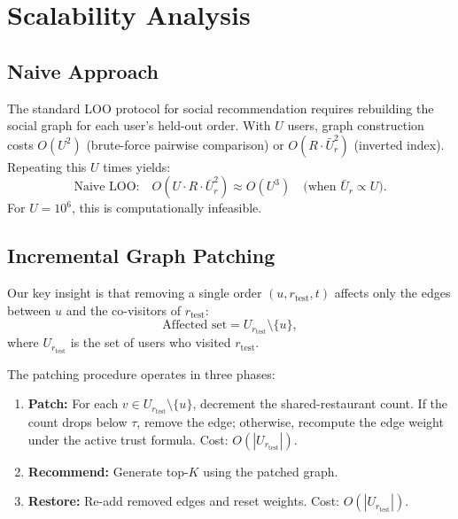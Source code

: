 \documentclass[conference]{IEEEtran}
\begin{document}
\section{Scalability Analysis}
\label{sec:scalability}

\subsection{Naive Approach}
The standard LOO protocol for social recommendation requires rebuilding
the social graph for each user's held-out order.  With $U$ users, graph
construction costs $O(U^2)$ (brute-force pairwise comparison) or
$O(R \cdot \bar{U}_r^2)$ (inverted index).  Repeating this $U$ times
yields:
\begin{equation}
  \text{Naive LOO:}\quad O(U \cdot R \cdot \bar{U}_r^2) \approx O(U^3)
    \quad \text{(when } \bar{U}_r \propto U \text{)}.
  \label{eq:naive}
\end{equation}
For $U = 10^6$, this is computationally infeasible.

\subsection{Incremental Graph Patching}
Our key insight is that removing a single order $(u, r_{\text{test}}, t)$
affects only the edges between $u$ and the co-visitors of
$r_{\text{test}}$:
\begin{equation}
  \text{Affected set} = U_{r_{\text{test}}} \setminus \{u\},
  \label{eq:affected}
\end{equation}
where $U_{r_{\text{test}}}$ is the set of users who visited
$r_{\text{test}}$.

The patching procedure operates in three phases:

\begin{enumerate}
  \item \textbf{Patch:} For each $v \in U_{r_{\text{test}}} \setminus
        \{u\}$, decrement the shared-restaurant count.  If the count drops
        below $\tau$, remove the edge; otherwise, recompute the edge weight
        under the active trust formula.  Cost: $O(|U_{r_{\text{test}}}|)$.

  \item \textbf{Recommend:} Generate top-$K$ using the patched graph.

  \item \textbf{Restore:} Re-add removed edges and reset weights.  Cost:
        $O(|U_{r_{\text{test}}}|)$.
\end{enumerate}
\end{document}
